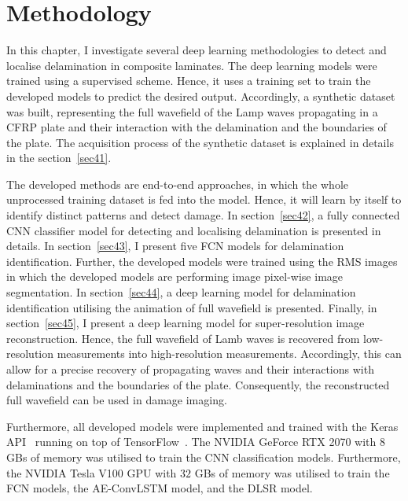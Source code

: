 \chapter[Methodology]{Methodology}
\label{ch4}

In this chapter, I investigate several deep learning methodologies to detect and localise delamination in composite laminates.
The deep learning models were trained using a supervised scheme. 
Hence, it uses a training set to train the developed models to predict the desired output.
Accordingly, a synthetic dataset was built, representing the full wavefield of the Lamp waves propagating in a CFRP plate and their interaction with the delamination and the boundaries of the plate.
The acquisition process of the synthetic dataset is explained in details in the section~\ref{sec41}.

The developed methods are end-to-end approaches, in which the whole unprocessed training dataset is fed into the model.
Hence, it will learn by itself to identify distinct patterns and detect damage.
In section~\ref{sec42}, a fully connected CNN classifier model for detecting and localising delamination is presented in details.
In section~\ref{sec43}, I present five FCN models for delamination identification. Further, the developed models were trained using the RMS images in which the developed models are performing image pixel-wise image segmentation.
In section~\ref{sec44}, a deep learning model for delamination identification utilising the animation of full wavefield is presented.
Finally, in section~\ref{sec45}, I present a deep learning model for super-resolution image reconstruction.
Hence, the full wavefield of Lamb waves is recovered from low-resolution measurements into high-resolution measurements.
Accordingly, this can allow for a precise recovery of propagating waves and their interactions with delaminations and the boundaries of the plate.
Consequently, the reconstructed full wavefield can be used in damage imaging. 


Furthermore, all developed models were implemented and trained with the Keras API~\cite{chollet2015keras} running on top of TensorFlow~\cite{Abadi2016}.
The NVIDIA GeForce RTX 2070 with \(8\) GBs of memory was utilised to train the CNN classification models.
Furthermore, the NVIDIA Tesla V100 GPU with \(32\) GBs of memory was utilised to train the FCN models, the AE-ConvLSTM model, and the DLSR model.








